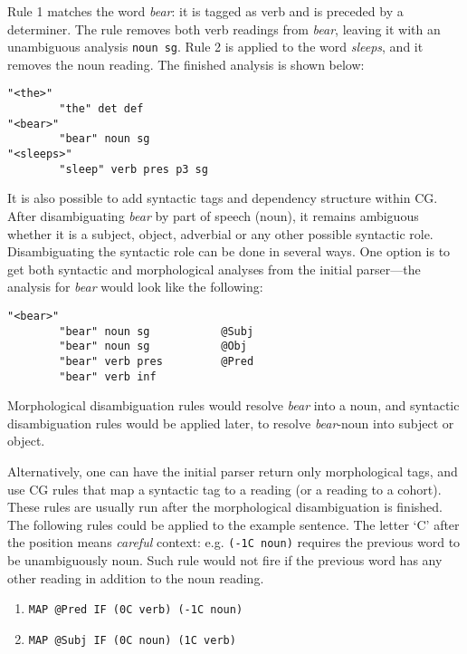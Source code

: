 \noindent Rule 1 matches the word \emph{bear}: it is tagged as verb and is
preceded by a determiner. The rule removes both verb readings from
\emph{bear}, leaving it with an unambiguous analysis \texttt{noun sg}.
Rule 2 is applied to the word \emph{sleeps}, and it removes the noun
reading. The finished analysis is shown below:


\begin{verbatim}
"<the>"
        "the" det def
"<bear>"
        "bear" noun sg
"<sleeps>"
        "sleep" verb pres p3 sg
\end{verbatim}

It is also possible to add syntactic tags and dependency structure within CG. 
After disambiguating \emph{bear} by part of speech (noun), it
remains ambiguous whether it is a subject, object, adverbial or
any other possible syntactic role.
Disambiguating the syntactic role can be done in several ways. One option is to get both
syntactic and morphological analyses from the initial parser---the analysis
for \emph{bear} would look like the following:

\begin{verbatim}
"<bear>"
        "bear" noun sg           @Subj
        "bear" noun sg           @Obj
        "bear" verb pres         @Pred
        "bear" verb inf 
\end{verbatim}

\noindent Morphological disambiguation rules would
resolve \emph{bear} into a noun, and syntactic disambiguation rules
would be applied later, to resolve \emph{bear}-noun into subject or object.

Alternatively, one can have the initial parser return only
morphological tags, and use CG rules that map a syntactic tag to a
reading (or a reading to a cohort).
These rules are usually run after the morphological disambiguation is
finished.
The following rules could be applied to the example sentence. The
letter `C' after the position means \emph{careful} context: e.g. 
\texttt{(-1C noun)} requires the previous word to be unambiguously
noun. Such rule would not fire if the previous word has any other
reading in addition to the noun reading.

\begin{enumerate}
\itemsep1pt\parskip0pt
\item[] \texttt{MAP @Pred IF (0C verb) (-1C noun)}
\item[] \texttt{MAP @Subj IF (0C noun) (1C verb)}
\end{enumerate}

